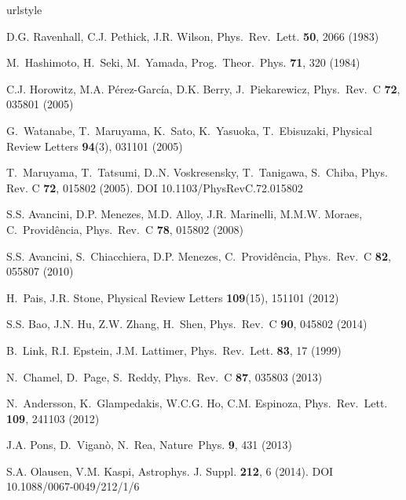 \documentclass[epj]{svjour}
\begin{document}
\begin{thebibliography}{10}
\providecommand{\url}[1]{{#1}}
\providecommand{\urlprefix}{URL }
\expandafter\ifx\csname urlstyle\endcsname\relax
  \providecommand{\doi}[1]{DOI \discretionary{}{}{}#1}\else
  \providecommand{\doi}{DOI \discretionary{}{}{}\begingroup
  \urlstyle{rm}\Url}\fi

D.G. Ravenhall, C.J. Pethick, J.R. Wilson, Phys.\ Rev.\ Lett. \textbf{50}, 2066
  (1983)

M.~Hashimoto, H.~Seki, M.~Yamada, Prog.\ Theor.\ Phys. \textbf{71}, 320 (1984)

C.J. Horowitz, M.A. P\'{e}rez-Garc\'{i}a, D.K. Berry, J.~Piekarewicz, Phys.\
  Rev.\ C \textbf{72}, 035801 (2005)

G.~Watanabe, T.~Maruyama, K.~Sato, K.~Yasuoka, T.~Ebisuzaki, Physical Review
  Letters \textbf{94}(3), 031101 (2005)

T.~Maruyama, T.~Tatsumi, D..N. Voskresensky, T.~Tanigawa, S.~Chiba, Phys. Rev.
  C \textbf{72}, 015802 (2005).
\newblock \doi{10.1103/PhysRevC.72.015802}

S.S. Avancini, D.P. Menezes, M.D. Alloy, J.R. Marinelli, M.M.W. Moraes,
  C.~Provid\^encia, Phys.\ Rev.\ C \textbf{78}, 015802 (2008)

S.S. Avancini, S.~Chiacchiera, D.P. Menezes, C.~Provid\^encia, Phys.\ Rev.\ C
  \textbf{82}, 055807 (2010)

H.~Pais, J.R. Stone, Physical Review Letters \textbf{109}(15), 151101 (2012)

S.S. Bao, J.N. Hu, Z.W. Zhang, H.~Shen, Phys.\ Rev.\ C \textbf{90}, 045802
  (2014)

B.~Link, R.I. Epstein, J.M. Lattimer, Phys.\ Rev.\ Lett. \textbf{83}, 17 (1999)

N.~Chamel, D.~Page, S.~Reddy, Phys.\ Rev.\ C \textbf{87}, 035803 (2013)

N.~Andersson, K.~Glampedakis, W.C.G. Ho, C.M. Espinoza, Phys.\ Rev.\ Lett.
  \textbf{109}, 241103 (2012)

J.A. Pons, D.~Vigan{\`o}, N.~Rea, Nature\ Phys. \textbf{9}, 431 (2013)

S.A. Olausen, V.M. Kaspi, Astrophys. J. Suppl. \textbf{212}, 6 (2014).
\newblock \doi{10.1088/0067-0049/212/1/6}


\end{thebibliography}
\end{document}
